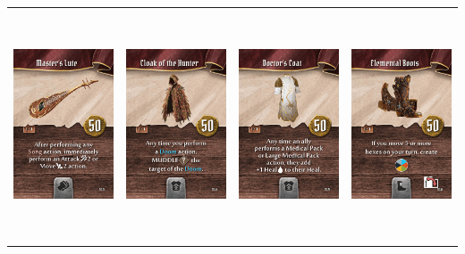 \documentclass{minimal}
\begin{document}
{\begin{longtable}{llll}
\includegraphics[width=44mm,height=68mm]{./64-151/gh-146-masters-lute.png} &
\includegraphics[width=44mm,height=68mm]{./64-151/gh-147-cloak-of-the-hunter.png} &
\includegraphics[width=44mm,height=68mm]{./64-151/gh-148-doctors-coat.png} &
\includegraphics[width=44mm,height=68mm]{./64-151/gh-149-elemental-boots.png}\\ 
\end{longtable}}
\end{document}
